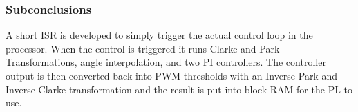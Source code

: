 









\subsubsection*{Subconclusions}
A short ISR is developed to simply trigger the actual control loop in the processor. When the control is triggered it runs Clarke and Park Transformations, angle interpolation, and two PI controllers. The controller output is then converted back into PWM thresholds with an Inverse Park and Inverse Clarke transformation and the result is put into block RAM for the PL to use.

